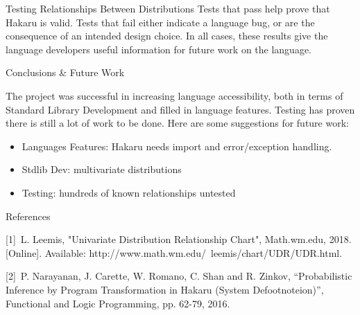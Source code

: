 \documentclass[22pt]{beamer}
\begin{document}
\begin{frame}[fragile]
\begin{textblock}{5}
\begin{block}{\Large{Testing Relationships Between Distributions}}
{\bigskip
Tests that pass help prove that Hakaru is valid. Tests that fail either indicate a language bug, or are the consequence of an intended design choice. In all cases, these results give the language developers useful information for future work on the language.
}

\end{block}


\begin{block}{\Large{Conclusions \& Future Work}}

\footnotesize{The project was successful in increasing language accessibility, both in terms of Standard Library Development and filled in language features. Testing has proven there is still a lot of work to be done. Here are some suggestions for future work:

\begin{itemize}
    \item Languages Features: Hakaru needs import and error/exception handling. 
    \item Stdlib Dev: multivariate distributions
    \item Testing: hundreds of known relationships untested 
\end{itemize}

}

\end{block}


\begin{block}{\Large{References}}

\footnotesize{[1]~L. Leemis, "Univariate Distribution Relationship Chart", Math.wm.edu, 2018. [Online]. Available: http://www.math.wm.edu/~leemis/chart/UDR/UDR.html. 

[2]~P. Narayanan, J. Carette, W. Romano, C. Shan and R. Zinkov, “Probabilistic Inference by Program Transformation in Hakaru (System Defootnoteion)”, Functional and Logic Programming, pp. 62-79, 2016.}


\end{block}


% 

\end{textblock}
\end{frame}
\end{document}
